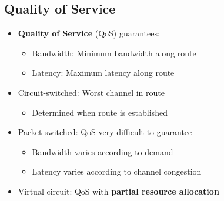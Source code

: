 \documentclass[conference]{IEEEtran}
\begin{document}
\subsection{Quality of Service}

\begin{itemize}
    \item \textbf{Quality of Service} (QoS) guarantees: 
    \begin{itemize}
        \item Bandwidth: Minimum bandwidth along route  
        \item Latency: Maximum latency along route 
    \end{itemize}

    \item Circuit-switched: Worst channel in route 
    \begin{itemize}
        \item Determined when route is established
    \end{itemize}
    \item Packet-switched: QoS very difficult to guarantee
    \begin{itemize}
        \item Bandwidth varies according to demand 
        \item Latency varies according to channel congestion
    \end{itemize}
    \item Virtual circuit: QoS with \textbf{partial resource allocation}
\end{itemize}




\end{document}
